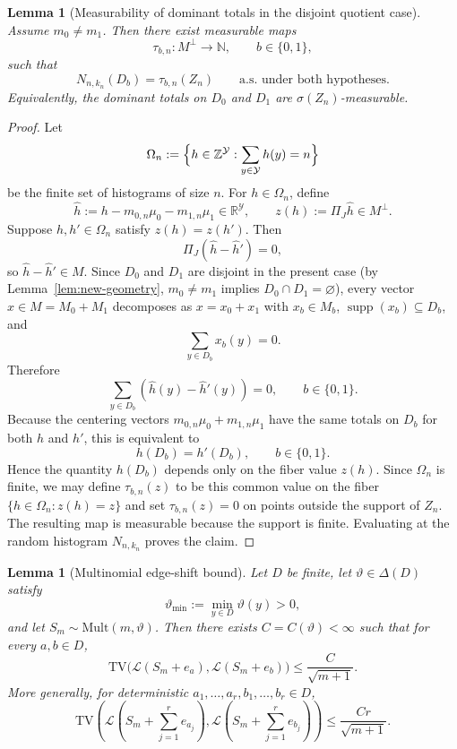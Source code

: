 \documentclass{article}
\newtheorem{lemma}[theorem]{Lemma}
\newcommand{\R}{\mathbb R}
\newcommand{\1}{\mathbf 1}
\DeclareMathOperator{\supp}{supp}
\begin{document}
\begin{lemma}[Measurability of dominant totals in the disjoint quotient case]
\label{lem:new-measurable-totals}
Assume $m_0\neq m_1$. Then there exist measurable maps
\[
\tau_{b,n}:M^\perp\to \mathbb N,\qquad b\in\{0,1\},
\]
such that
\[
N_{n,k_n}(D_b)=\tau_{b,n}(Z_n)\qquad\text{a.s. under both hypotheses.}
\]
Equivalently, the dominant totals on $D_0$ and $D_1$ are $\sigma(Z_n)$-measurable.
\end{lemma}

\begin{proof}
Let
\[
\Omega_n:=\Bigl\{h\in\mathbb Z^{\mathcal Y}:\sum_{y\in\mathcal Y}h(y)=n\Bigr\}
\]
be the finite set of histograms of size $n$. For $h\in\Omega_n$, define
\[
\widehat h:=h-m_{0,n}\mu_0-m_{1,n}\mu_1\in\R^{\mathcal Y},
\qquad z(h):=\Pi_J\widehat h\in M^\perp.
\]
Suppose $h,h'\in\Omega_n$ satisfy $z(h)=z(h')$. Then
\[
\Pi_J(\widehat h-\widehat h')=0,
\]
so $\widehat h-\widehat h'\in M$. Since $D_0$ and $D_1$ are disjoint in the present case (by Lemma~\ref{lem:new-geometry},
$m_0\neq m_1$ implies $D_0\cap D_1=\varnothing$), every vector $x\in M=M_0+M_1$ decomposes as $x=x_0+x_1$ with
$x_b\in M_b$, $\supp(x_b)\subseteq D_b$, and
\[
\sum_{y\in D_b}x_b(y)=0.
\]
Therefore
\[
\sum_{y\in D_b}(\widehat h(y)-\widehat h'(y))=0,
\qquad b\in\{0,1\}.
\]
Because the centering vectors $m_{0,n}\mu_0+m_{1,n}\mu_1$ have the same totals on $D_b$ for both $h$ and $h'$, this
is equivalent to
\[
h(D_b)=h'(D_b),\qquad b\in\{0,1\}.
\]
Hence the quantity $h(D_b)$ depends only on the fiber value $z(h)$. Since $\Omega_n$ is finite, we may define
$\tau_{b,n}(z)$ to be this common value on the fiber $\{h\in\Omega_n:z(h)=z\}$ and set $\tau_{b,n}(z)=0$ on points
outside the support of $Z_n$. The resulting map is measurable because the support is finite. Evaluating at the
random histogram $N_{n,k_n}$ proves the claim.
\end{proof}

\begin{lemma}[Multinomial edge-shift bound]
\label{lem:new-edge-shift}
Let $D$ be finite, let $\vartheta\in\Delta(D)$ satisfy
\[
\vartheta_{\min}:=\min_{y\in D}\vartheta(y)>0,
\]
and let $S_m\sim \mathrm{Mult}(m,\vartheta)$.
Then there exists $C=C(\vartheta)<\infty$ such that for every $a,b\in D$,
\[
\mathrm{TV}\bigl(\mathcal L(S_m+e_a),\mathcal L(S_m+e_b)\bigr)
\le \frac{C}{\sqrt{m+1}}.
\]
More generally, for deterministic $a_1,\dots,a_r,b_1,\dots,b_r\in D$,
\[
\mathrm{TV}\!\left(
\mathcal L\!\left(S_m+\sum_{j=1}^r e_{a_j}\right),
\mathcal L\!\left(S_m+\sum_{j=1}^r e_{b_j}\right)
\right)
\le \frac{Cr}{\sqrt{m+1}}.
\]
\end{lemma}
\end{document}
